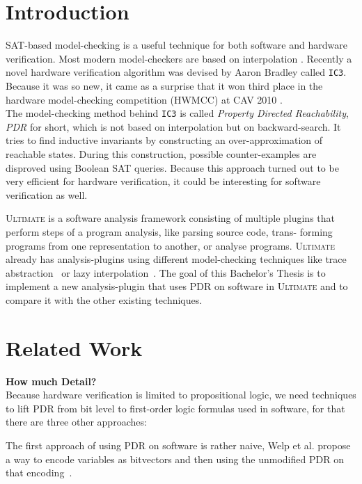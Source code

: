 \documentclass[11pt, a4paper, BCOR=10mm, ngerman, oneside]{scrbook}
\begin{document}
\chapter{Introduction}
SAT-based model-checking is a useful technique for both software and hardware verification. Most modern model-checkers are based on interpolation \cite{DBLP:conf/cav/VizelG14}. 
Recently a novel hardware verification algorithm was devised by Aaron Bradley \cite{DBLP:conf/vmcai/Bradley11} called \texttt{IC3}.
Because it was so new, it came as a surprise that it won third place in the hardware
model-checking competition (HWMCC) at CAV 2010 \cite{cav}. \\ The model-checking method behind \texttt{IC3} is called \textsl{Property Directed Reachability}, \textsl{PDR} for short, which is not based on interpolation but on backward-search. It tries to find inductive invariants by constructing an over-approximation of reachable states. During this construction, possible counter-examples are disproved using Boolean SAT queries. Because this approach turned out to be very efficient for hardware verification, it could be interesting for software verification as well. \\ \par
\textsc{Ultimate} \cite{Zitat02} is a software analysis framework consisting of multiple plugins that perform steps of a program analysis, like parsing source code, trans-
forming programs from one representation to another, or analyse programs.
 \textsc{Ultimate} already has analysis-plugins using different model-checking techniques like trace abstraction~\cite{DBLP:conf/cav/HeizmannHP13} or lazy interpolation~\cite{DBLP:conf/popl/HenzingerJMS02}.
The goal of this Bachelor's Thesis is to implement a new analysis-plugin that uses PDR on software in \textsc{Ultimate} and to compare it with the other existing techniques.


\chapter{Related Work}
\textbf{How much Detail?} \\
Because hardware verification is limited to propositional logic, we need techniques to lift PDR from bit level to first-order logic formulas used in software, for that there are three other approaches: \par

The first approach of using PDR on software is rather naive, Welp et al. propose a way to encode variables as bitvectors and then using the unmodified PDR on that encoding~\cite{DBLP:conf/date/WelpK13}. 
\end{document}

